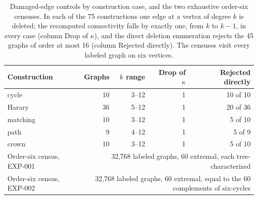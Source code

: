 \begin{table}[ht]
\centering\small
\begin{tabular}{lrrrr}
\toprule
Construction & Graphs & $k$ range & Drop of $\kappa$ & Rejected directly\\
\midrule
cycle & 10 & 3--12 & 1 & 10 of 10\\
Harary & 36 & 5--12 & 1 & 20 of 36\\
matching & 10 & 3--12 & 1 & 5 of 10\\
path & 9 & 4--12 & 1 & 5 of 9\\
crown & 10 & 3--12 & 1 & 5 of 10\\
\midrule
Order-six census, EXP-001 & \multicolumn{4}{p{0.46\textwidth}}{32{,}768 labeled graphs, 60 extremal, each tree-characterized}\\
Order-six census, EXP-002 & \multicolumn{4}{p{0.46\textwidth}}{32{,}768 labeled graphs, 60 extremal, equal to the 60 complements of six-cycles}\\
\bottomrule
\end{tabular}
\caption{Damaged-edge controls by construction case, and the two exhaustive order-six censuses. In each of the 75 constructions one edge at a vertex of degree $k$ is deleted; the recomputed connectivity falls by exactly one, from $k$ to $k-1$, in every case (column Drop of $\kappa$), and the direct deletion enumeration rejects the 45 graphs of order at most 16 (column Rejected directly). The censuses visit every labeled graph on six vertices.}
\label{tab:damaged}
\end{table}
